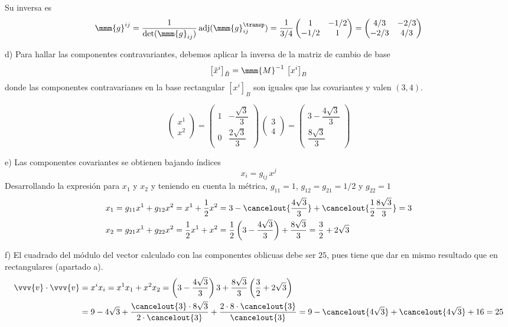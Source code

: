 Su inversa es
\[
  \mmm{g}^{ij}
  = \dfrac{1}{\det(\mmm{g}_{ij})}\, \text{adj}(\mmm{g}_{ij}^\transp)
  = \dfrac{1}{3/4}
  \begin{pmatrix}
    1 & -1/2\\
    -1/2 & 1
  \end{pmatrix}
  = \begin{pmatrix}
    4/3 & -2/3\\
    -2/3 & 4/3
  \end{pmatrix}
\]

\noindent
d) Para hallar las componentes contravariantes, debemos aplicar la inversa de la matriz
de cambio de base
\[
  \left[\tilde{x}^i\right]_{\tilde{B}} = \mmm{M}^{-1}\, \left[x^i\right]_{B}
\]
donde las componentes contravarianes en la base rectangular $[x^i]_{B}$ son iguales
que las covariantes y valen $(3, 4)$.

\[
  \begin{pmatrix}
    x^1\\
    x^2
  \end{pmatrix}
  = \begin{pmatrix}
    1 & -\dfrac{\sqrt{3}}{3}\\[1.5ex]
    0 & \dfrac{2\sqrt{3}}{3}
  \end{pmatrix}
  \,
  \begin{pmatrix}
    3\\
    4
  \end{pmatrix}
  = \begin{pmatrix}
    3 - \dfrac{4\sqrt{3}}{3}\\[1.5ex]
    \dfrac{8\sqrt{3}}{3}
  \end{pmatrix}
\]

\noindent
e) Las componentes covariantes se obtienen bajando índices
\[
  x_i = g_{ij}\,x^j
\]
Desarrollando la expresión para $x_1$ y $x_2$ y teniendo en cuenta la métrica,
$g_{11} = 1$, $g_{12}=g_{21}=1/2$ y $g_{22}=1$
\begin{align*}
  x_1
  &= g_{11}x^1 + g_{12}x^2 = x^1 + \dfrac{1}{2}x^2
    = 3 - \cancelout{\dfrac{4\sqrt{3}}{3}} + \cancelout{\dfrac{1}{2}\dfrac{8\sqrt{3}}{3}}
    = 3\\
  x_2
  &= g_{21}x^1 + g_{22} x^2 = \dfrac{1}{2}x^1 + x^2
    = \dfrac{1}{2}\left(3-\dfrac{4\sqrt{3}}{3}\right) + \dfrac{8\sqrt{3}}{3}
    = \dfrac{3}{2} + 2\sqrt{3}
\end{align*}

\noindent
f) El cuadrado del módulo del vector calculado con las componentes oblicuas debe ser
$25$, pues tiene que dar en mismo resultado que en rectangulares (apartado a).
\begin{align*}
  \vvv{v}\cdot\vvv{v}
  &=
    x^ix_i
    = x^1 x_1 + x^2 x_2
    = \left(3-\dfrac{4\sqrt{3}}{3}\right) 3
    + \dfrac{8\sqrt{3}}{3} \left(\dfrac{3}{2} + 2\sqrt{3}\right)\\
  &=
    9 - 4\sqrt{3}
    + \dfrac{\cancelout{3}\cdot 8\sqrt{3}}{2\cdot\cancelout{3}}
    + \dfrac{2\cdot 8\cdot \cancelout{3}}{\cancelout{3}}
    = 9 - \cancelout{4\sqrt{3}} + \cancelout{4\sqrt{3}} + 16
    = 25
\end{align*}

